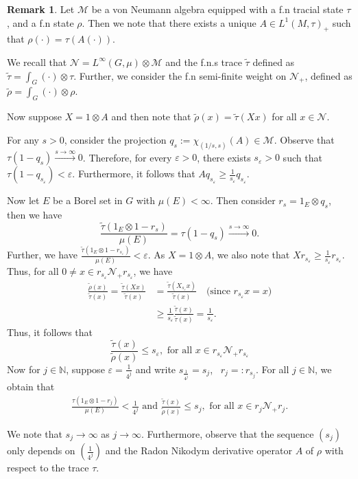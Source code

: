 \documentclass[11pt]{amsart}
\theoremstyle{definition}
\theoremstyle{myremark}
\newtheorem{rem}[thm]{Remark}
\numberwithin{equation}{section}
\def\N{\mathbb N}
\newcommand{\CM}{\mathcal{M}}
\newcommand{\CN}{\mathcal{N}}
\newcommand{\eps}{\varepsilon}
\begin{document}
\begin{rem}\label{trace-proj}
Let $\CM$ be a von Neumann algebra equipped with a f.n tracial state $\tau$, and a f.n state  $ \rho$. 
Then we note that there exists a unique  $A \in L^1(M, \tau)_+$ such that $ \rho( \cdot ) = \tau( A( \cdot)).$


\noindent We recall that $ \CN = L^\infty(G, \mu) \otimes \CM$ and the f.n.s trace $ \widetilde{\tau} $ defined as  $ \widetilde{\tau} = \int_G( \cdot) \otimes \tau$. Further, we consider the f.n semi-finite weight on $ \CN_+$, defined as  $ \widetilde{ \rho} = \int_G( \cdot) \otimes \rho $. 

\noindent Now suppose $X= 1 \otimes A$ and then note that   $\widetilde{\rho}(x) = \widetilde{\tau}(Xx)$ for all $x \in \CN$. 



		
\noindent For any $s > 0$, consider the projection $q_s :=  \chi_{(1/s, s)}(A) \in \CM$. Observe that $\tau(1 - q_s) \xrightarrow{s \to \infty} 0$. Therefore, for every $\eps > 0$, there exists $s_\eps > 0$ such that $\tau(1 - q_{s_\eps}) < \eps$. Furthermore, it follows that $A q_{s_\eps} \geq  \frac{1}{s_\eps} q_{s_\eps}$. 

Now let $ E $ be a Borel set in $ G$ with $\mu(E) < \infty $. Then consider $ r_s = 1_E \otimes q_s$, then we have $$\frac{\widetilde{\tau}(1_E \otimes 1 - r_s)}{\mu(E)} = \tau(1-q_s) \xrightarrow{s \to \infty} 0.$$
Further, we have $ \frac{\widetilde{\tau}(1_E \otimes 1 - r_{s_\eps})}{\mu(E)} < \eps $. As $ X = 1\otimes A$, we also note that $ X r_{ s_\eps} \geq \frac{1}{s_\eps} r_{s_\eps} $.\\
Thus, for all $0 \neq x \in r_{s_\eps} \CN_+ r_{s_\eps}$, we have
		\begin{align*}
			\frac{\widetilde{\rho}(x)}{\widetilde{\tau}(x)} = \frac{\widetilde{\tau}(Xx)}{\widetilde{\tau}(x)} &= \frac{\widetilde{\tau}(X _{s_\eps} x)}{\widetilde{\tau}(x)} \quad  \text{(since $r_{s_\eps} x = x$)}\\
			&\geq \frac{1}{s_\eps}  \frac{\widetilde{\tau}( x)}{\widetilde{\tau}(x)} = \frac{1}{s_\eps}.
		\end{align*}
Thus, it follows that 
$$ \frac{\widetilde{\tau}( x) }{\widetilde{\rho}(x)} \leq s_\eps, \text{ for all } x \in r_{s_\eps} \CN_+ r_{s_\eps} $$
Now for $j \in \N$,  suppose $ \eps = \frac{1}{4^j}$ and   write $ s_{\frac{1}{4^j}} = s_j $,  ~$ r_j =: r_{ s_j} $. For all $ j \in \N$,  we obtain that 
\begin{align}\label{trace-state}
\frac{\tau( 1_E \otimes 1-r_j)}{\mu(E)} < \frac{1}{4^j} \text{ and } \frac{\widetilde{\tau}( x) }{\widetilde{\rho}(x)} \leq s_j, \text{ for all } x \in r_{j} \CN_+ r_{j}.
\end{align}





\noindent We note that $ s_j \to \infty $ as $j \to \infty$. Furthermore, observe that the sequence $(s_j)$ only depends on $ (\frac{1}{4^j})$ and the Radon Nikodym derivative operator $A$ of $\rho$ with respect to the trace $\tau$.
\end{rem}
\end{document}
